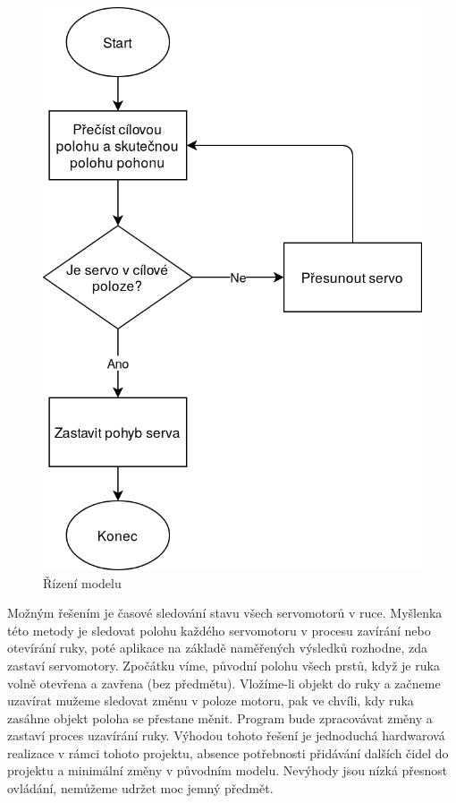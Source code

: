 \documentclass[thesis=B,czech]{FITthesis}[2012/06/26]
\begin{document}
 \begin{figure}[H]
\centering
\includegraphics[scale=0.35]{./image/servoAlg.png}
\caption{Řízení modelu}
\label{fig:servoAlg}
\end{figure}


Možným řešením je časové sledování stavu všech servomotorů v ruce. Myšlenka této metody je sledovat polohu každého servomotoru v procesu zavírání nebo otevírání ruky, poté aplikace na základě naměřených výsledků rozhodne, zda zastaví servomotory. Zpočátku víme, původní polohu všech prstů, když je ruka volně otevřena a zavřena (bez předmětu). Vložíme-li objekt do ruky a začneme uzavírat mužeme sledovat změnu v poloze motoru, pak ve chvíli, kdy ruka zasáhne objekt poloha se přestane měnit. Program bude zpracovávat změny a zastaví proces uzavírání ruky. Výhodou tohoto řešení je jednoduchá hardwarová realizace v rámci tohoto projektu, absence potřebnosti přidávání dalších čidel do projektu a minimální změny v původním modelu. Nevýhody jsou nízká přesnost ovládání, nemůžeme udržet moc jemný předmět. 
\end{document}
